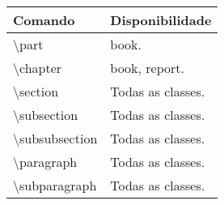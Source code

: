% 
% 
% 
% 
% 
\begin{tabular}{lp{}}
    \hline
    Comando & Disponibilidade \\ \hline
    \textbackslash\textsf{part} & \textsf{book}. \\
    \textbackslash\textsf{chapter} & \textsf{book}, \textsf{report}. \\
    \textbackslash\textsf{section} & Todas as classes. \\
    \textbackslash\textsf{subsection} & Todas as classes. \\
    \textbackslash\textsf{subsubsection} & Todas as classes. \\
    \textbackslash\textsf{paragraph} & Todas as classes. \\
    \textbackslash\textsf{subparagraph} & Todas as classes. \\ \hline
\end{tabular}
